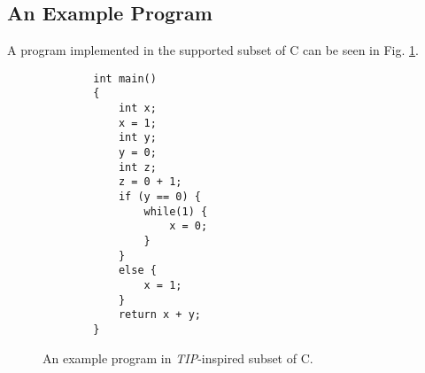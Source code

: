 \subsection{An Example Program}
A program implemented in the supported subset of C can be seen in Fig. \ref{exampleprogram}.

\begin{figure}[H]
    \centering
    \begin{verbatim}
        int main()
        {
            int x;
            x = 1;
            int y;
            y = 0;
            int z;
            z = 0 + 1;
            if (y == 0) {
                while(1) {
                    x = 0;
                }
            }
            else {
                x = 1;
            }
            return x + y;
        }
    \end{verbatim}
    \caption{An example program in \textit{TIP}-inspired subset of C.}
    \label{exampleprogram}
\end{figure}

